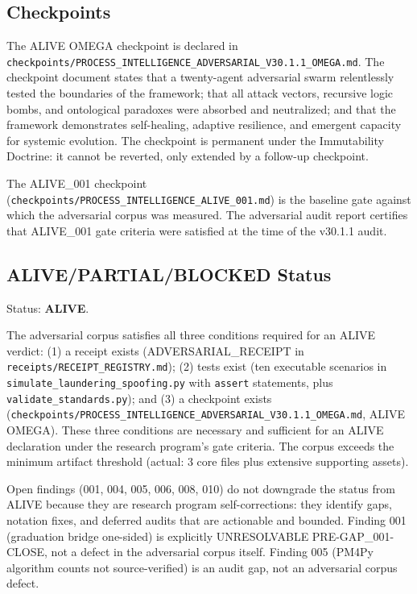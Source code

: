 \subsection{Checkpoints}
\label{sec:adversarial-evidence-checkpoints}

The ALIVE OMEGA checkpoint is declared in
\texttt{checkpoints/PROCESS\_INTELLIGENCE\_ADVERSARIAL\_V30.1.1\_OMEGA.md}. The checkpoint
document states that a twenty-agent adversarial swarm relentlessly tested the boundaries of
the framework; that all attack vectors, recursive logic bombs, and ontological paradoxes were
absorbed and neutralized; and that the framework demonstrates self-healing, adaptive
resilience, and emergent capacity for systemic evolution. The checkpoint is permanent under
the Immutability Doctrine: it cannot be reverted, only extended by a follow-up checkpoint.

The ALIVE\_001 checkpoint (\texttt{checkpoints/PROCESS\_INTELLIGENCE\_ALIVE\_001.md}) is the
baseline gate against which the adversarial corpus was measured. The adversarial audit report
certifies that ALIVE\_001 gate criteria were satisfied at the time of the v30.1.1 audit.

\subsection{ALIVE/PARTIAL/BLOCKED Status}
\label{sec:adversarial-evidence-status}

Status: \textbf{ALIVE}.

The adversarial corpus satisfies all three conditions required for an ALIVE verdict: (1) a
receipt exists (ADVERSARIAL\_RECEIPT in \texttt{receipts/RECEIPT\_REGISTRY.md}); (2) tests
exist (ten executable scenarios in \texttt{simulate\_laundering\_spoofing.py} with
\texttt{assert} statements, plus \texttt{validate\_standards.py}); and (3) a checkpoint
exists (\texttt{checkpoints/PROCESS\_INTELLIGENCE\_ADVERSARIAL\_V30.1.1\_OMEGA.md}, ALIVE
OMEGA). These three conditions are necessary and sufficient for an ALIVE declaration under
the research program's gate criteria. The corpus exceeds the minimum artifact threshold
(actual: 3 core files plus extensive supporting assets).

Open findings (001, 004, 005, 006, 008, 010) do not downgrade the status from ALIVE because
they are research program self-corrections: they identify gaps, notation fixes, and deferred
audits that are actionable and bounded. Finding 001 (graduation bridge one-sided) is
explicitly UNRESOLVABLE PRE-GAP\_001-CLOSE, not a defect in the adversarial corpus itself.
Finding 005 (PM4Py algorithm counts not source-verified) is an audit gap, not an adversarial
corpus defect.
